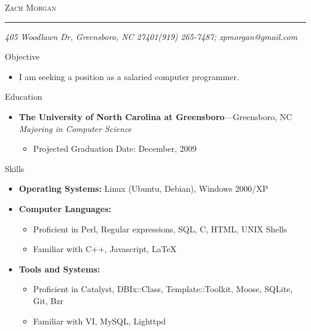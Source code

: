 \documentclass[11pt,oneside]{article}
\makeatletter
\newcommand{\name}{Zach Morgan}
\newcommand{\addr}{405 Woodlawn Dr, Greensboro, NC 27401}
\newcommand{\phone}{(919) 265-7487}
\newcommand{\email}{zpmorgan@gmail.com}
\newcommand{\bigname}[1]{
	\begin{center}\fontfamily{phv}\selectfont\Huge\scshape#1\end{center}
}
\newenvironment{ressection}[1]{
	\vspace{4pt}
	{\fontfamily{phv}\selectfont\Large#1}
	\begin{itemize}
	\vspace{3pt}
}{
	\end{itemize}
}
\newcommand{\resitem}[1]{
	\vspace{-4pt}
	\item \begin{flushleft} #1 \end{flushleft}
}
\newcommand{\ressubitem}[1]{
	\vspace{-1pt}
	\item \begin{flushleft} #1 \end{flushleft}
}
\newcommand{\resbigitem}[3]{
	\vspace{-5pt}
	\item
	\textbf{#1}---#2 \\
	\textit{#3}
}
\newenvironment{ressubsec}[3]{
	\resbigitem{#1}{#2}{#3}
	\vspace{-2pt}
	\begin{itemize}
}{
	\end{itemize}
}
\newenvironment{reslist}[1]{
	\resitem{\textbf{#1}}
	\vspace{-5pt}
	\begin{itemize}
}{
	\end{itemize}
}
\makeatother
\begin{document}
 \selectfont

\bigname{\name}

\vspace{-8pt} \rule{\textwidth}{1pt}

\vspace{-1pt} {\small\itshape \addr \hfill \phone; \email}

\vspace{8 pt}




\begin{ressection}{Objective}

   \resitem{I am seeking a position as a salaried computer programmer.}
	
\end{ressection}


\begin{ressection}{Education}

	\begin{ressubsec}{The University of North Carolina at Greensboro}{Greensboro, NC}{Majoring in Computer Science}
		\ressubitem{Projected Graduation Date: December, 2009}
	\end{ressubsec}

\end{ressection}


\begin{ressection}{Skills}

	\resitem{\textbf{Operating Systems:} Linux (Ubuntu, Debian), Windows 2000/XP}

	\begin{reslist}{Computer Languages:}

		\ressubitem{Proficient in Perl, Regular expressions, SQL, C, HTML, UNIX Shells}

		\ressubitem{Familiar with C++, Javascript, \LaTeX}

	\end{reslist}

	\begin{reslist}{Tools and Systems:}

		\ressubitem{Proficient in Catalyst, DBIx::Class, Template::Toolkit, Moose, SQLite, Git, Bzr}

		\ressubitem{Familiar with VI, MySQL, Lighttpd}

	\end{reslist}


\end{ressection}
\end{document}
